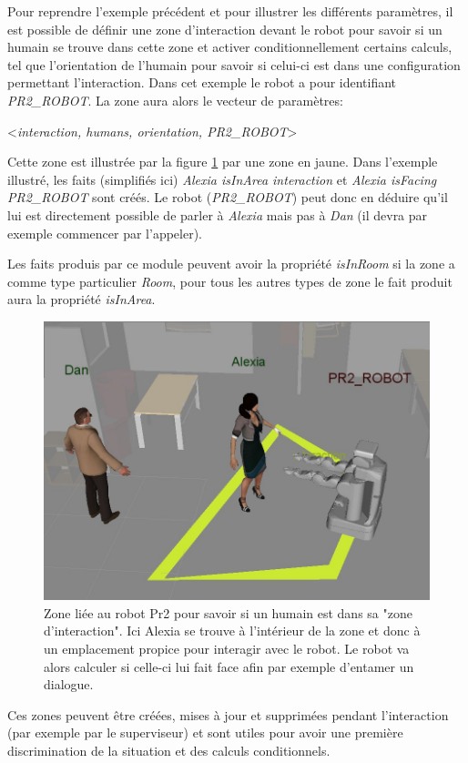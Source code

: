 \documentclass[a4paper,11pt,twoside]{StyleThese}
\begin{document}
Pour reprendre l'exemple précédent et pour illustrer les différents paramètres, il est possible de définir une zone d'interaction devant le robot pour savoir si un humain se trouve dans cette zone et activer conditionnellement certains calculs, tel que l'orientation de l'humain pour savoir si celui-ci est dans une configuration permettant l'interaction.
Dans cet exemple le robot a pour identifiant \textit{PR2\_ROBOT}. La zone aura alors le vecteur de paramètres:
\begin{center}
<\textit{interaction, humans, orientation, PR2\_ROBOT}>
\end{center}
Cette zone est illustrée par la figure \ref{fig:interaction} par une zone en jaune.
Dans l'exemple illustré, les faits (simplifiés ici) \textit{Alexia isInArea interaction} et \textit{Alexia isFacing PR2\_ROBOT} sont créés. Le robot (\textit{PR2\_ROBOT}) peut donc en déduire qu'il lui est directement possible de parler à \textit{Alexia} mais pas à \textit{Dan} (il devra par exemple commencer par l'appeler).

Les faits produis par ce module peuvent avoir la propriété \textit{isInRoom} si la zone a comme type particulier \textit{Room}, pour tous les autres types de zone le fait produit aura la propriété \textit{isInArea}.


\begin{figure}[ht!]
 \centering
  \includegraphics[width=0.69\linewidth]{./img/interactionarea.jpg} 
    \caption {Zone liée au robot Pr2 pour savoir si un humain est dans sa "zone d'interaction". Ici Alexia se trouve à l'intérieur de la zone et donc à un emplacement propice pour interagir avec le robot. Le robot va alors calculer si celle-ci lui fait face afin par exemple d'entamer un dialogue.}
  \label{fig:interaction}
\end{figure}

Ces zones peuvent être créées, mises à jour et supprimées pendant l'interaction (par exemple par le superviseur) et sont utiles pour avoir une première discrimination de la situation et des calculs conditionnels.
\end{document}

